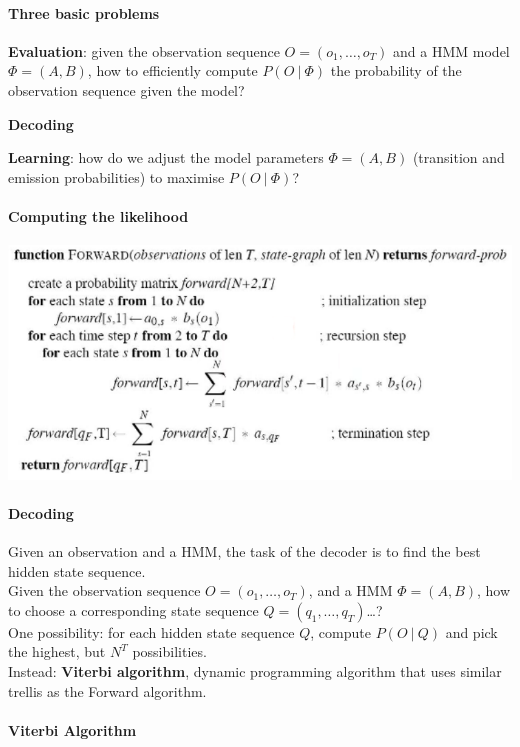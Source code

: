 \documentclass[10pt]{report}
\begin{document}
\paragraph{Three basic problems}
\begin{list}{}{}
	\item \textbf{Evaluation}: given the observation sequence $O = (o_1,\ldots,o_T)$ and a HMM model $\Phi = (A, B)$, how to efficiently compute $P(O\:|\:\Phi)$ the probability of the observation sequence given the model?
	\item \textbf{Decoding} %
	\item \textbf{Learning}: how do we adjust the model parameters $\Phi = (A,B)$ (transition and emission probabilities) to maximise $P(O\:|\:\Phi)$?
\end{list}
\paragraph{Computing the likelihood} %
\begin{center}
	\includegraphics[scale=0.5]{15.png}
\end{center}
\paragraph{Decoding} Given an observation and a HMM, the task of the decoder is to find the best hidden state sequence.\\
Given the observation sequence $O = (o_1,\ldots,o_T)$, and a HMM $\Phi = (A, B)$, how to choose a corresponding state sequence $Q = (q_1,\ldots,q_T)$\ldots?\\ %
One possibility: for each hidden state sequence $Q$, compute $P(O\:|\:Q)$ and pick the highest, but $N^T$ possibilities.\\
Instead: \textbf{Viterbi algorithm}, dynamic programming algorithm that uses similar trellis as the Forward algorithm.
\paragraph{Viterbi Algorithm} %
\end{document}
